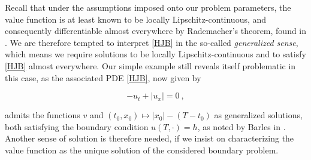 	Recall that under the assumptions imposed onto our problem parameters, the value function is at least known to be locally Lipschitz-continuous, and consequently differentiable almost everywhere by Rademacher's theorem, found in \cite{evans}. We are therefore tempted to interpret \ref{HJB} in the so-called \emph{generalized sense}, which means we require solutions to be locally Lipschitz-continuous and to satisfy \ref{HJB} almost everywhere. Our simple example still reveals itself problematic in this case, as the associated PDE \ref{HJB}, now given by
	
	\begin{equation*}
		-u_t + \lvert u_x \rvert = 0 \ ,
	\end{equation*}
	
	admits the functions $ v $ and $ (t_0, x_0) \mapsto \lvert x_0 \rvert - (T - t_0) $ as generalized solutions, both satisfying the boundary condition $ u(T, \cdot) = h $, as noted by Barles in \cite{barles}. Another sense of solution is therefore needed, if we insist on characterizing the value function as the unique solution of the considered boundary problem.